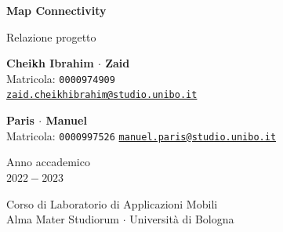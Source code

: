 \documentclass[11pt]{article}
\begin{document}
\begin{titlepage}
    \begin{center}
        \vspace*{3.0cm}
            
        \Huge
        \textbf{Map Connectivity}
            
        \vspace{0.3cm}
        \LARGE
        Relazione progetto

        \vspace{1.5cm}
          
        \begin{minipage}[t]{0.47\textwidth}
            \begin{center}
                {\large{\bf Cheikh Ibrahim $\cdot$ Zaid}}\\
                {\large Matricola: \texttt{0000974909}} \\
                {\large{\href{mailto:zaid.cheikhibrahim@studio.unibo.it}{\texttt{zaid.cheikhibrahim@studio.unibo.it}}}}
            \end{center}
    
            \end{minipage}
            \hfill
            \begin{minipage}[t]{0.47\textwidth}\raggedleft
            \begin{center}
                {\large{\bf Paris $\cdot$ Manuel}}\\
                {\large Matricola: \texttt{0000997526}}
                {\large{\href{mailto:manuel.paris@studio.unibo.it}{\texttt{manuel.paris@studio.unibo.it}}}}
            \end{center}
        \end{minipage}
            
        \vspace{6cm}
            
        Anno accademico\\
        $2022 - 2023$
            
        \vspace{0.8cm}
            
            
        \Large
        Corso di Laboratorio di Applicazioni Mobili\\
        Alma Mater Studiorum $\cdot$ Università di Bologna\\
            
    \end{center}
\end{titlepage}
\pagebreak
{} 
\tableofcontents
\pagebreak
{} 
\end{document}
